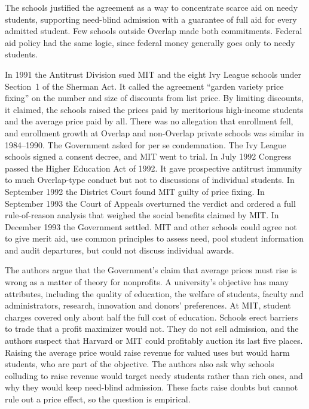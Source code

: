 The schools justified the agreement as a way to concentrate scarce aid on needy students, supporting need-blind
admission with a guarantee of full aid for every admitted student. Few schools outside Overlap made both
commitments. Federal aid policy had the same logic, since federal money generally goes only to needy students.

In 1991 the Antitrust Division sued MIT and the eight Ivy League schools under Section~1 of the Sherman Act. It
called the agreement ``garden variety price fixing'' on the number and size of discounts from list price. By
limiting discounts, it claimed, the schools raised the prices paid by meritorious high-income students and the
average price paid by all. There was no allegation that enrollment fell, and enrollment growth at Overlap and
non-Overlap private schools was similar in 1984--1990. The Government asked for per se condemnation. The Ivy League
schools signed a consent decree, and MIT went to trial. In July 1992 Congress passed the Higher Education Act
of 1992. It gave prospective antitrust immunity to much Overlap-type conduct but not to discussions of individual
students. In September 1992 the District Court found MIT guilty of price fixing. In September 1993 the Court of
Appeals overturned the
verdict and ordered a full rule-of-reason analysis that weighed the social benefits claimed by MIT. In December 1993
the Government settled. MIT and other schools could agree not to give merit aid, use common principles to assess
need, pool student information and audit departures, but could not discuss individual awards.

The authors argue that the Government's claim that average prices must rise is wrong as a matter of theory for
nonprofits. A university's objective has many attributes, including the quality of education, the welfare of
students, faculty and administrators, research, innovation and donors' preferences. At MIT, student charges covered
only about half the full cost of education. Schools erect barriers to trade that a profit maximizer would not. They
do not sell admission, and the authors suspect that Harvard or MIT could profitably auction its last five places.
Raising the average price would raise revenue for valued uses but would harm students, who are part of the
objective. The authors also ask why schools colluding to raise revenue would target needy students rather than
rich ones, and why they would keep need-blind admission. These facts raise doubts but cannot rule out a price
effect, so the question is empirical.

